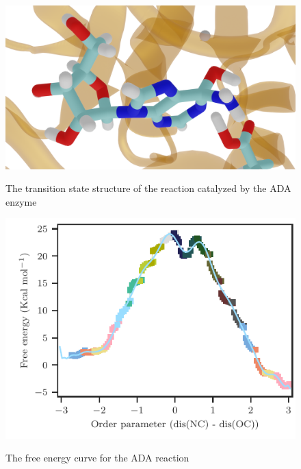\documentclass[journal=jpcbfk,manuscript=article,layout=twocolumn]{achemso}
\begin{document}
\begin{figure}
\centering
\includegraphics[scale=0.12]{blender-images/ada/ada-trans.png}
\label{fig:ada-trans}
\caption{The transition state structure of the reaction catalyzed by the ADA enzyme}
\end{figure}

\begin{figure}[ht!]
\includegraphics[scale=1.0]{./figures/ada-fenergy.pdf}
\label{fig:ada-fenergy}
\caption{The free energy curve for the ADA reaction}
\end{figure}

\end{document}
